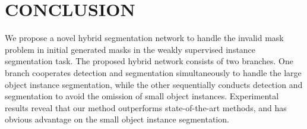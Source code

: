 \documentclass{article}
\begin{document}
\section{CONCLUSION}
\label{sec:conclusion}
We propose a novel hybrid segmentation network to handle the invalid mask problem in initial generated masks in the weakly supervised instance segmentation task.
The proposed hybrid network consists of two branches.
One branch cooperates detection and segmentation simultaneously to handle the large object instance segmentation, while the other sequentially conducts detection and segmentation to avoid the omission of small object instances.
Experimental results reveal that our method outperforms state-of-the-art methods, and has obvious advantage on the small object instance segmentation.

\vfill\pagebreak



\end{document}
